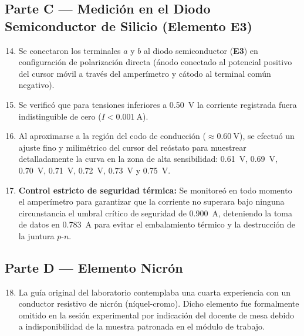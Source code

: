 \subsection{Parte C --- Medición en el Diodo Semiconductor de Silicio (Elemento E3)}
\begin{enumerate}
    \setcounter{enumi}{13}
    \item Se conectaron los terminales $a$ y $b$ al diodo semiconductor (\textbf{E3}) en configuración de polarización directa (ánodo conectado al potencial positivo del cursor móvil a través del amperímetro y cátodo al terminal común negativo).
    \item Se verificó que para tensiones inferiores a \qty{0,50}{\volt} la corriente registrada fuera indistinguible de cero ($I < \qty{0,001}{\ampere}$).
    \item Al aproximarse a la región del codo de conducción ($\approx \qty{0,60}{\volt}$), se efectuó un ajuste fino y milimétrico del cursor del reóstato para muestrear detalladamente la curva en la zona de alta sensibilidad: \qty{0,61}{\volt}, \qty{0,69}{\volt}, \qty{0,70}{\volt}, \qty{0,71}{\volt}, \qty{0,72}{\volt}, \qty{0,73}{\volt} y \qty{0,75}{\volt}.
    \item \textbf{Control estricto de seguridad térmica:} Se monitoreó en todo momento el amperímetro para garantizar que la corriente no superara bajo ninguna circunstancia el umbral crítico de seguridad de \qty{0,900}{\ampere}, deteniendo la toma de datos en \qty{0,783}{\ampere} para evitar el embalamiento térmico y la destrucción de la juntura $p$-$n$.
\end{enumerate}

\subsection{Parte D --- Elemento Nicrón}
\begin{enumerate}
    \setcounter{enumi}{17}
    \item La guía original del laboratorio contemplaba una cuarta experiencia con un conductor resistivo de nicrón (níquel-cromo). Dicho elemento fue formalmente omitido en la sesión experimental por indicación del docente de mesa debido a indisponibilidad de la muestra patronada en el módulo de trabajo.
\end{enumerate}